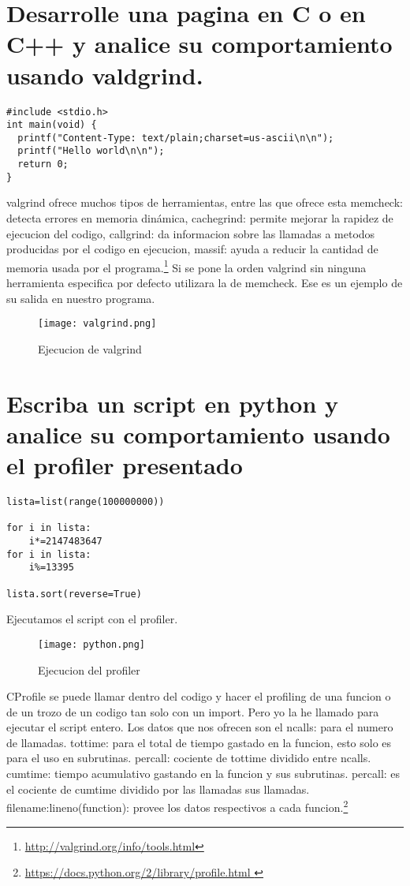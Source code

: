\section{Desarrolle una pagina en C o en C++ y analice su comportamiento usando valdgrind.}
\begin{verbatim}
#include <stdio.h>
int main(void) {
  printf("Content-Type: text/plain;charset=us-ascii\n\n");
  printf("Hello world\n\n");
  return 0;
}
\end{verbatim}
valgrind ofrece muchos tipos de herramientas, entre las que ofrece esta memcheck: detecta errores en memoria dinámica, cachegrind: permite mejorar la rapidez de ejecucion del codigo, callgrind: da informacion sobre las llamadas a metodos producidas por el codigo en ejecucion, massif: ayuda a reducir la cantidad de memoria usada por el programa.\footnote{\url{http://valgrind.org/info/tools.html}}
Si se pone la orden valgrind sin ninguna herramienta especifica por defecto utilizara la de memcheck. Ese es un ejemplo de su salida en nuestro programa.
\begin{figure}[H] 
\centering
\texttt{[image: valgrind.png]}  
\label{figura24:}
\caption{Ejecucion de valgrind}
\end{figure}

\section{Escriba un script en python y analice su comportamiento usando el profiler presentado}
\begin{verbatim}
lista=list(range(100000000))

for i in lista:
	i*=2147483647
for i in lista:
	i%=13395

lista.sort(reverse=True)
\end{verbatim}
Ejecutamos el script con el profiler.
\begin{figure}[H] 
\centering
\texttt{[image: python.png]}  
\label{figura24:}
\caption{Ejecucion del profiler}
\end{figure}
CProfile se puede llamar dentro del codigo y hacer el profiling de una funcion o de un trozo de un codigo tan solo con un import. Pero yo la he llamado para ejecutar el script entero. Los datos que nos ofrecen son el ncalls: para el numero de llamadas. tottime: para el total de tiempo gastado en la funcion, esto solo es para el uso en subrutinas. percall: cociente de tottime dividido entre ncalls. cumtime: tiempo acumulativo gastando en la funcion y sus subrutinas. percall: es el cociente de cumtime dividido por las llamadas sus llamadas. filename:lineno(function): provee los datos respectivos a cada funcion.\footnote{\url{https://docs.python.org/2/library/profile.html
}}
